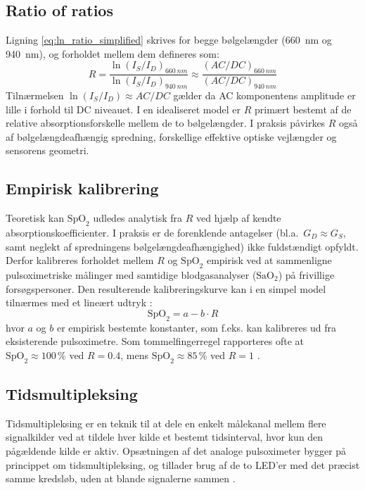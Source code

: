 \subsection{Ratio of ratios}
\label{sec:ratio_of_ratios}
Ligning \ref{eq:ln_ratio_simplified} skrives for begge bølgelængder (\SI{660}{nm} og \SI{940}{nm}), og forholdet mellem dem defineres som:
\begin{equation}
    R = \frac{\ln(I_S / I_D)_{\SI{660}{nm}}}{\ln(I_S / I_D)_{\SI{940}{nm}}} 
    \approx \frac{(AC/DC)_{\SI{660}{nm}}}{(AC/DC)_{\SI{940}{nm}}}
    \label{eq:ratio_of_ratios}
\end{equation}
Tilnærmelsen $\ln(I_S/I_D) \approx AC/DC$ gælder da AC komponentens amplitude er lille i forhold til DC niveauet. I en idealiseret model er $R$ primært bestemt af de relative absorptionsforskelle mellem de to bølgelængder. I praksis påvirkes $R$ også af bølgelængdeafhængig spredning, forskellige effektive optiske vejlængder og sensorens geometri.

\subsection{Empirisk kalibrering}
Teoretisk kan $\text{SpO}_2$ udledes analytisk fra $R$ ved hjælp af kendte absorptionskoefficienter. I praksis er de forenklende antagelser (bl.a.\ $G_D \approx G_S$, samt neglekt af spredningens bølgelængdeafhængighed) ikke fuldstændigt opfyldt. Derfor kalibreres forholdet mellem $R$ og $\text{SpO}_2$ empirisk ved at sammenligne pulsoximetriske målinger med samtidige blodgasanalyser ($\text{SaO}_2$) på frivillige forsøgspersoner. Den resulterende kalibreringskurve kan i en simpel model tilnærmes med et lineært udtryk \cite{Webster1997}:
\begin{equation}
    \text{SpO}_2 = a - b \cdot R
    \label{eq:spo2_calibration}
\end{equation}
hvor $a$ og $b$ er empirisk bestemte konstanter, som f.eks. kan kalibreres ud fra eksisterende pulsoximetre. Som tommelfingerregel rapporteres ofte at $\text{SpO}_2 \approx 100\,\%$ ved $R = 0.4$, mens $\text{SpO}_2 \approx 85\,\%$  ved $R = 1$ \cite{Webster1997}.

\subsection{Tidsmultipleksing}

Tidsmultipleksing er en teknik til at dele en enkelt målekanal mellem flere signalkilder ved at tildele hver kilde et bestemt tidsinterval, hvor kun den pågældende kilde er aktiv. Opsætningen af det analoge pulsoximeter bygger på princippet om tidsmultipleksing, og tillader brug af de to LED'er med det præcist samme kredsløb, uden at blande signalerne sammen \cite[s.~126--129]{Webster1997}.


